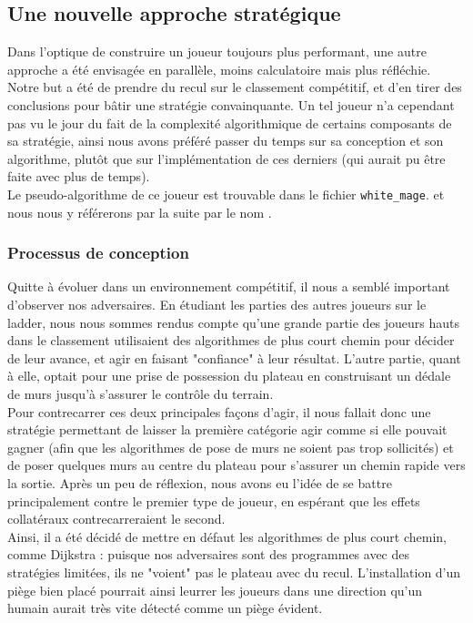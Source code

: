 \documentclass[a4paper]{article}
\begin{document}
 
 \subsection{Une nouvelle approche stratégique}
 
 Dans l'optique de construire un joueur toujours plus performant, une autre approche a été envisagée en parallèle, moins calculatoire mais plus réfléchie. Notre but a été de prendre du recul sur le classement compétitif, et d'en tirer des conclusions pour bâtir une stratégie convainquante. Un tel joueur n'a cependant pas vu le jour du fait de la complexité algorithmique de certains composants de sa stratégie, ainsi nous avons préféré passer du temps sur sa conception et son algorithme, plutôt que sur l'implémentation de ces derniers (qui aurait pu être faite avec plus de temps). \\
 
Le pseudo-algorithme de ce joueur est trouvable dans le fichier \texttt{white\_mage}. et nous nous y référerons par la suite par le nom .

\subsubsection{Processus de conception}

Quitte à évoluer dans un environnement compétitif, il nous a semblé important d'observer nos adversaires. En étudiant les parties des autres joueurs sur le ladder, nous nous sommes rendus compte qu'une grande partie des joueurs hauts dans le classement utilisaient des algorithmes de plus court chemin pour décider de leur avance, et agir en faisant "confiance" à leur résultat. L'autre partie, quant à elle, optait pour une prise de possession du plateau en construisant un dédale de murs jusqu'à s'assurer le contrôle du terrain. \\

Pour contrecarrer ces deux principales façons d'agir, il nous fallait donc une stratégie permettant de laisser la première catégorie agir comme si elle pouvait gagner (afin que les algorithmes de pose de murs ne soient pas trop sollicités) et de poser quelques murs au centre du plateau pour s'assurer un chemin rapide vers la sortie. Après un peu de réflexion, nous avons eu l'idée de se battre principalement contre le premier type de joueur, en espérant que les effets collatéraux contrecarreraient le second. \\

Ainsi, il a été décidé de mettre en défaut les algorithmes de plus court chemin, comme Dijkstra : puisque nos adversaires sont des programmes avec des stratégies limitées, ils ne "voient" pas le plateau avec du recul. L'installation d'un piège bien placé pourrait ainsi leurrer les joueurs dans une direction qu'un humain aurait très vite détecté comme un piège évident. \\
\end{document}
